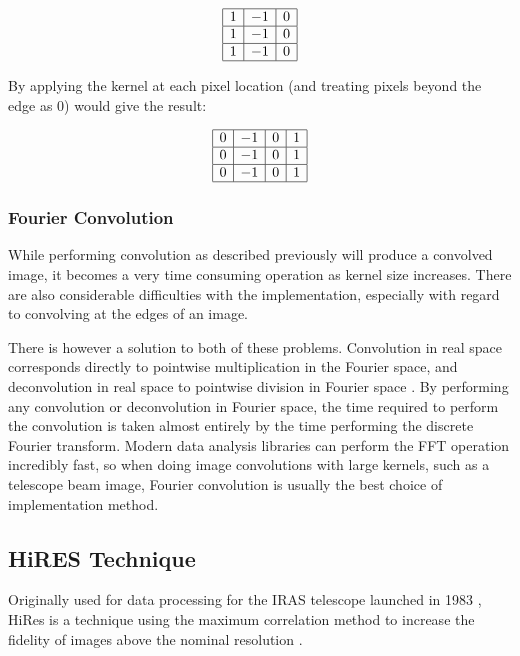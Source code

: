 \[
\begin{array}{|c|c|c|}
    \hline
1 & -1 & 0 \\
\hline
1 & -1 & 0 \\
\hline
1 &  -1 & 0 \\
\hline
\end{array}
\]

By applying the kernel at each pixel location (and treating pixels beyond the edge as 0) would give the result:

\[
\begin{array}{|c|c|c|c|}
    \hline
0 & -1 & 0 & 1 \\
\hline
0 & -1 & 0 & 1 \\
\hline
0 & -1 & 0 & 1 \\
\hline
\end{array}
\]

\subsubsection{Fourier Convolution}

While performing convolution as described previously will produce a convolved image, it becomes a very time consuming operation as kernel size increases. There are also considerable difficulties with the implementation, especially with regard to convolving at the edges of an image.

There is however a solution to both of these problems. Convolution in real space corresponds directly to pointwise multiplication in the Fourier space, and deconvolution in real space to pointwise division in Fourier space \citep{katznelson2004introduction}. By performing any convolution or deconvolution in Fourier space, the time required to perform the convolution is taken almost entirely by the time performing the discrete Fourier transform. Modern data analysis libraries can perform the FFT operation incredibly fast, so when doing image convolutions with large kernels, such as a telescope beam image, Fourier convolution is usually the best choice of implementation method.

\subsection{HiRES Technique}

Originally used for data processing for the IRAS telescope launched in 1983 \citep{neugebauer1984infrared}, HiRes is a technique using the maximum correlation method to increase the fidelity of images above the nominal resolution \citep{aumann1990maximum}.

